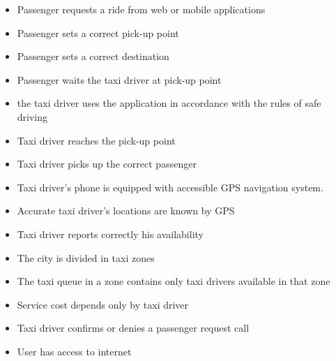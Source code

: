 \begin{itemize}
	\item Passenger requests a ride from web or mobile applications
	\item Passenger sets a correct pick-up point
	\item Passenger sets a correct destination
	\item Passenger waits the taxi driver at pick-up point
	\item the taxi driver uses the application in accordance with the rules of safe driving
	\item Taxi driver reaches the pick-up point
	\item Taxi driver picks up the correct passenger
	\item Taxi driver's phone is equipped with accessible GPS navigation system.
	\item Accurate taxi driver's locations are known by GPS
	\item Taxi driver reports correctly his availability
	\item The city is divided in taxi zones
	\item The taxi queue in a zone contains only taxi drivers available in that zone
	\item Service cost depends only by taxi driver
	\item Taxi driver confirms or denies a passenger request call
	\item User has access to internet
\end{itemize}